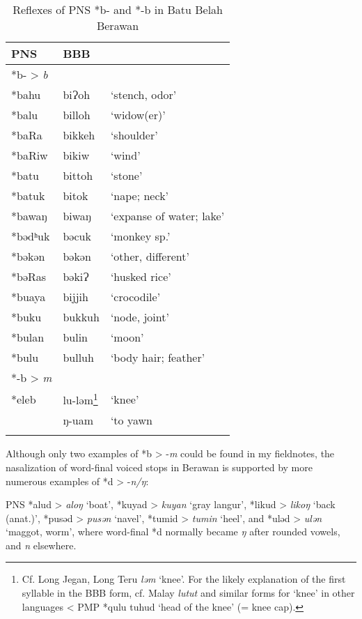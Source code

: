 \documentclass[output=paper]{langscibook}
\begin{document}
\begin{table}[b]
\caption{\label{tab:Reflexes-BBB-PNS-b}Reflexes of PNS *b- and *-b in Batu Belah Berawan}
\begin{tabular}{lll}
  \lsptoprule
    PNS  &     BBB     & \\
\midrule
*b- > \textit{b}      \\
\midrule
    *bahu   &   biɁoh   &    `stench, odor' \\
    *balu   &   billoh  &    `widow(er)'\\
    *baRa   &   bikkeh  &    `shoulder'\\
    *baRiw  &  bikiw    &    `wind'  \\
    *batu   &   bittoh  &    `stone'\\
    *batuk  &    bitok  &    `nape; neck'\\
    *bawaŋ  &  biwaŋ    &    `expanse of water; lake' \\
    *bədʰuk &   bəcuk   &    `monkey sp.' \\
    *bəkən  &    bəkən  &    `other, different' \\
    *bəRas  &    bəkiɁ  &    `husked rice' \\
    *buaya  &    bijjih &    `crocodile' \\
    *buku   &   bukkuh  &    `node, joint' \\
    *bulan  &    bulin  &    `moon' \\
    *bulu   &   bulluh  &    `body hair; feather' \\
\midrule
*-b > \textit{m} \\
\midrule
    *eleb   &   lu-ləm\footnote{Cf. Long Jegan, Long Teru \textit{ləm} ‘knee’. For the likely explanation of the first syllable in the BBB form, cf. Malay \textit{lutut} and similar forms for ‘knee’ in other languages < PMP *qulu tuhud ‘head of the knee’ (= knee cap).}    &    `knee'\\
            &   ŋ-uam   &     `to yawn\\
\lspbottomrule
\end{tabular}
\end{table}

Although only two examples of *b > -\textit{m} could be found in my fieldnotes, the nasalization of word-final voiced stops in Berawan is supported by more numerous examples of *d > -\textit{n/ŋ}:

\ea
PNS *alud > \textit{aloŋ} ‘boat’, *kuyad > \textit{kuyan} ‘gray langur’, *likud > \textit{likoŋ} ‘back (anat.)’, *pusəd > \textit{pusən} ‘navel’, *tumid > \textit{tumin} ‘heel’, and *uləd > \textit{ulən} ‘maggot, worm’, where word-final *d normally became \textit{ŋ} after rounded vowels, and \textit{n} elsewhere.
\z
\end{document}
